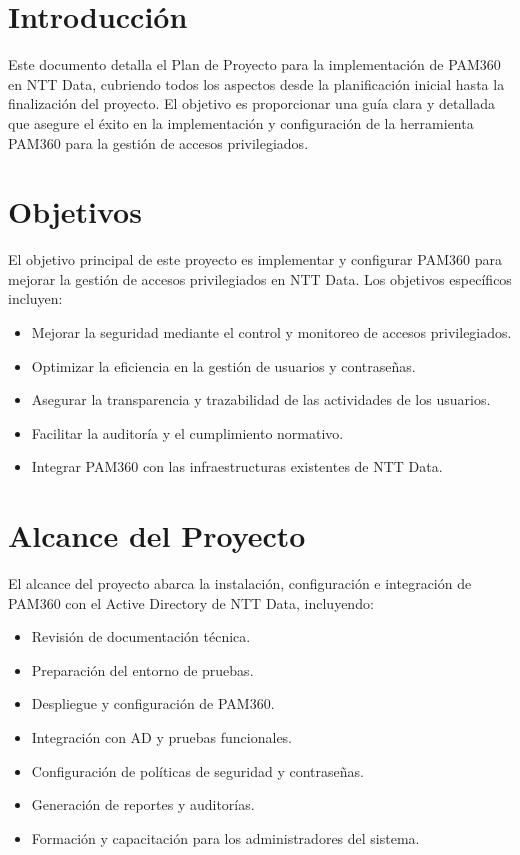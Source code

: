 
\section{Introducción}

Este documento detalla el Plan de Proyecto para la implementación de PAM360 en NTT Data, cubriendo todos los aspectos desde la planificación inicial hasta la finalización del proyecto. El objetivo es proporcionar una guía clara y detallada que asegure el éxito en la implementación y configuración de la herramienta PAM360 para la gestión de accesos privilegiados.

\section{Objetivos}

El objetivo principal de este proyecto es implementar y configurar PAM360 para mejorar la gestión de accesos privilegiados en NTT Data. Los objetivos específicos incluyen:

\begin{itemize}
	\item Mejorar la seguridad mediante el control y monitoreo de accesos privilegiados.
	\item Optimizar la eficiencia en la gestión de usuarios y contraseñas.
	\item Asegurar la transparencia y trazabilidad de las actividades de los usuarios.
	\item Facilitar la auditoría y el cumplimiento normativo.
	\item Integrar PAM360 con las infraestructuras existentes de NTT Data.
\end{itemize}

\section{Alcance del Proyecto}

El alcance del proyecto abarca la instalación, configuración e integración de PAM360 con el Active Directory de NTT Data, incluyendo:

\begin{itemize}
	\item Revisión de documentación técnica.
	\item Preparación del entorno de pruebas.
	\item Despliegue y configuración de PAM360.
	\item Integración con AD y pruebas funcionales.
	\item Configuración de políticas de seguridad y contraseñas.
	\item Generación de reportes y auditorías.
	\item Formación y capacitación para los administradores del sistema.
\end{itemize}

